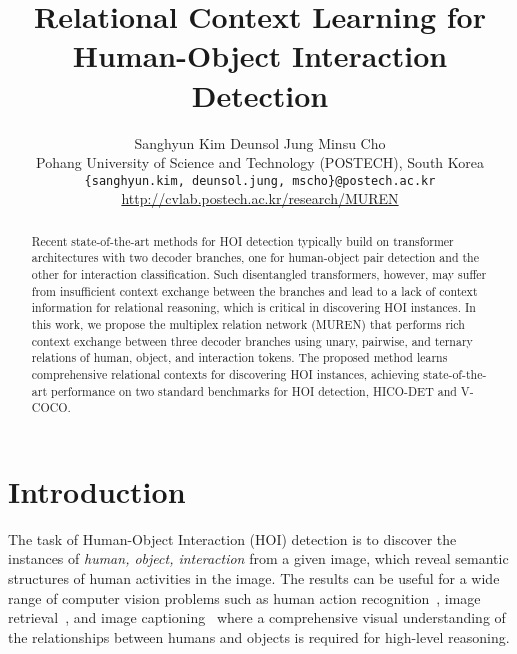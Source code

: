 \documentclass[10pt,twocolumn,letterpaper]{article}
\begin{document}
\title{Relational Context Learning for Human-Object Interaction Detection}

\author{Sanghyun Kim \hspace{0.8cm}  Deunsol Jung \hspace{0.8cm}  Minsu Cho \vspace{1.5mm}\\
Pohang University of Science and Technology (POSTECH), South Korea \\
{\tt\small \{sanghyun.kim, deunsol.jung, mscho\}@postech.ac.kr} \\
\small
\href{http://cvlab.postech.ac.kr/research/MUREN}{\url{http://cvlab.postech.ac.kr/research/MUREN}}
}


\maketitle

\begin{abstract}
Recent state-of-the-art methods for HOI detection typically build on transformer architectures with two decoder branches, one for human-object pair detection and the other for interaction classification.
Such disentangled transformers, however, may suffer from insufficient context exchange between the branches and lead to a lack of context information for relational reasoning, which is critical in discovering HOI instances.
In this work, we propose the multiplex relation network (MUREN) that performs rich context exchange between three decoder branches using unary, pairwise, and ternary relations of human, object, and interaction tokens. 
The proposed method learns comprehensive relational contexts for discovering HOI instances, achieving state-of-the-art performance on two standard benchmarks for HOI detection, HICO-DET and V-COCO. 


\end{abstract} 


\section{Introduction}
The task of Human-Object Interaction (HOI) detection is to discover the instances of \textit{human, object, interaction} from a given image, which reveal semantic structures of human activities in the image.
The results can be useful for a wide range of computer vision problems such as human action recognition~\cite{moon2021integralaction,bretti2021zero,zhang2019structured}, image retrieval~\cite{Wu_2022_CVPR,yoon2021image,gordo2017beyond}, and image captioning~\cite{Wu_2022_caption,yao2018exploring,herdade2019image} where a comprehensive visual understanding of the relationships between humans and objects is required for high-level reasoning.
\end{document}
